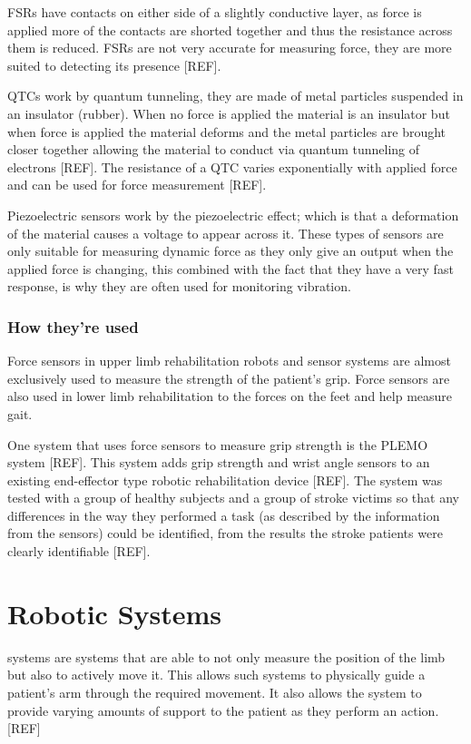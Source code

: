 \documentclass[journal]{IEEEtran}
\begin{document}
FSRs have contacts on either side of a slightly conductive layer, as force is applied more of 
the contacts are shorted together and thus the resistance across them is reduced. FSRs 
are not very accurate for measuring force, they are more suited to detecting its presence [REF].

QTCs work by quantum tunneling, they are made of metal particles suspended in an insulator 
(rubber). When no force is applied the material is an insulator but when force is applied the 
material deforms and the metal particles are brought closer together allowing the material to 
conduct via quantum tunneling of electrons [REF]. The resistance of a QTC varies 
exponentially with applied force and can be used for force measurement [REF].

Piezoelectric sensors work by the piezoelectric effect; which is that a deformation of the material 
causes a voltage to appear across it. These types of sensors are only suitable for measuring 
dynamic force as they only give an output when the applied force is changing, this combined 
with the fact that they have a very fast response, is why they are often used for monitoring 
vibration.

\subsubsection{How they're used}
Force sensors in upper limb rehabilitation robots and sensor systems are almost exclusively 
used to measure the strength of the patient's grip. Force sensors are also used in lower 
limb rehabilitation to the forces on the feet and help measure gait.

One system that uses force sensors to measure grip strength is the PLEMO system [REF]. 
This system adds grip strength and wrist angle sensors to an existing end-effector type 
robotic rehabilitation device [REF]. The system was tested with a group of healthy subjects 
and a group of stroke victims so that any differences in the way they performed a task 
(as described by the information from the sensors) could be identified, from the results 
the stroke patients were clearly identifiable [REF].


\section{Robotic Systems}
 systems are systems that are able to not only measure the position 
of the limb but also to actively move it. This allows such systems to physically guide a patient's 
arm through the required movement. It also allows the system to provide varying amounts of 
support to the patient as they perform an action. [REF]
\end{document}
